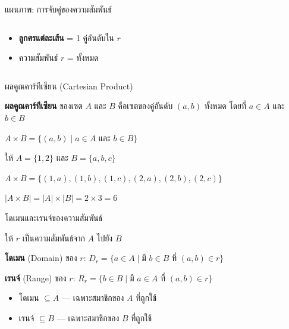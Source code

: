 \documentclass[11pt, aspectratio=169]{beamer}
\begin{document}
\begin{frame}{แผนภาพ: การจับคู่ของความสัมพันธ์}
\begin{columns}[T]
      \begin{intuition}[หลักการ]
        \begin{itemize}
          \item \textbf{ลูกศรแต่ละเส้น} = 1 คู่อันดับใน $r$
          \item ความสัมพันธ์ $r$ = ทั้งหมด
        \end{itemize}
      \end{intuition}
  \end{columns}
\end{frame}\begin{frame}{ผลคูณคาร์ทีเซียน (Cartesian Product)}
  \begin{explanation}
    \textbf{ผลคูณคาร์ทีเซียน} ของเซต $A$ และ $B$ คือเซตของคู่อันดับ $(a, b)$ ทั้งหมด
    โดยที่ $a \in A$ และ $b \in B$

    \medskip
    $A \times B = \{(a, b) \mid a \in A \text{ และ } b \in B\}$
  \end{explanation}

  \begin{exambox}[ตัวอย่าง]
    ให้ $A = \{1, 2\}$ และ $B = \{a, b, c\}$

    \medskip
    $A \times B = \{(1,a), (1,b), (1,c), (2,a), (2,b), (2,c)\}$

    \medskip
    $|A \times B| = |A| \times |B| = 2 \times 3 = 6$
  \end{exambox}
\end{frame}\begin{frame}{โดเมนและเรนจ์ของความสัมพันธ์}
  \begin{explanation}[นิยาม]
    ให้ $r$ เป็นความสัมพันธ์จาก $A$ ไปยัง $B$

    \medskip
    \textbf{โดเมน} (Domain) ของ $r$:
    \quad $D_r = \{a \in A \mid \text{มี } b \in B \text{ ที่ } (a,b) \in r\}$

    \medskip
    \textbf{เรนจ์} (Range) ของ $r$:
    \quad $R_r = \{b \in B \mid \text{มี } a \in A \text{ ที่ } (a,b) \in r\}$
  \end{explanation}

  \begin{itemize}
    \item โดเมน $\subseteq A$ — เฉพาะสมาชิกของ $A$ ที่ถูกใช้
    \item เรนจ์ $\subseteq B$ — เฉพาะสมาชิกของ $B$ ที่ถูกใช้
  \end{itemize}


\end{frame}
\end{document}
